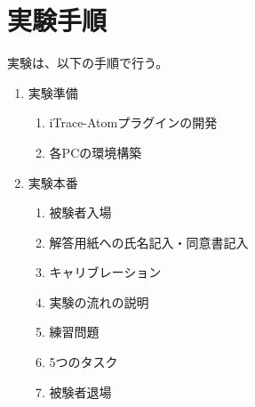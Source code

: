 \documentclass[paper=a4paper,fontsize=10pt]{jlreq}
\begin{document}
  \section{実験手順}
  実験は、以下の手順で行う。
  \begin{enumerate}
    \item 実験準備
      \begin{enumerate}
        \item iTrace-Atomプラグインの開発
        \item 各PCの環境構築
      \end{enumerate}
    \item 実験本番
      \begin{enumerate}
        \item 被験者入場
        \item 解答用紙への氏名記入・同意書記入
        \item キャリブレーション
        \item 実験の流れの説明
        \item 練習問題
        \item 5つのタスク
        \item 被験者退場
      \end{enumerate}
  \end{enumerate}
\end{document}
